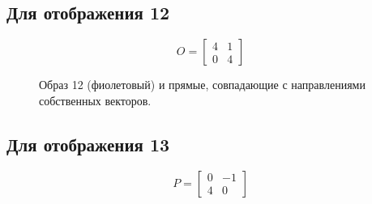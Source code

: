 \documentclass[a5paper, 10pt]{article}
\theoremstyle{definition}
\theoremstyle{plain}
\theoremstyle{remark}
\begin{document}
\newpage
\subsection{Для отображения 12}
\begin{equation}
O =
\begin{bmatrix}
4 & 1\\
0 & 4
\end{bmatrix}
\end{equation}

\begin{figure}[h]
\caption{Образ 12 (фиолетовый) и прямые, совпадающие с направлениями собственных векторов.}
\end{figure}


\newpage
\subsection{Для отображения 13}
\begin{equation}
P =
\begin{bmatrix}
0 & -1\\
4 & 0
\end{bmatrix}
\end{equation}
\end{document}
